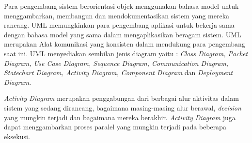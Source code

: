 Para pengembang sistem berorientasi objek menggunakan bahasa model untuk menggambarkan, membangun
dan mendokumentasikan sistem yang mereka rancang. UML memungkinkan para pengembang aplikasi untuk
bekerja sama dengan bahasa model yang sama dalam mengaplikasikan beragam sistem. UML merupakan Alat
komunikasi yang konsisten dalam mendukung para pengembang saat ini. UML menyediakan sembilan jenis
diagram yaitu : \textit{Class Diagram, Packet Diagram, Use Case Diagram, Sequence Diagram,
    Communication Diagram, Statechart Diagram, Activity Diagram, Component Diagram} dan
\textit{Deployment Diagram}.

\textit{Activity Diagram} merupakan penggabungan dari berbagai alur aktivitas dalam sistem yang sedang
dirancang, bagaimana masing-masing alur berawal, \textit{decision} yang  mungkin  terjadi dan bagaimana
mereka  berakhir. \textit{Activity Diagram} juga dapat menggambarkan proses paralel yang mungkin terjadi
pada beberapa  eksekusi.


